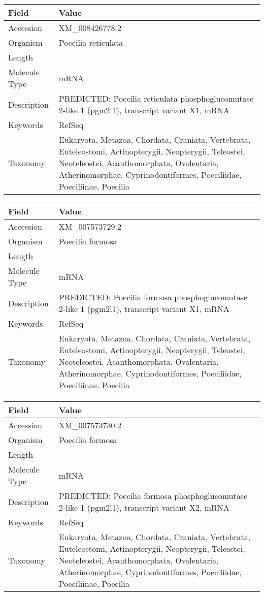 \documentclass[10pt]{article}
\begin{document}
{\footnotesize
\begin{longtable}{>{\raggedright\arraybackslash}p{4.5cm} >{\raggedright\arraybackslash}p{11.5cm}}
\textbf{Field} & \textbf{Value} \\
\hline
Accession & XM\_008426778.2 \\
Organism & Poecilia reticulata \\
Length & 3028 \\
Molecule Type & mRNA \\
Description & PREDICTED: Poecilia reticulata phosphoglucomutase 2-like 1 (pgm2l1), transcript variant X1, mRNA \\
Keywords & RefSeq \\
Taxonomy & Eukaryota, Metazoa, Chordata, Craniata, Vertebrata, Euteleostomi, Actinopterygii, Neopterygii, Teleostei, Neoteleostei, Acanthomorphata, Ovalentaria, Atherinomorphae, Cyprinodontiformes, Poeciliidae, Poeciliinae, Poecilia \\
\end{longtable}
}

{\footnotesize
\begin{longtable}{>{\raggedright\arraybackslash}p{4.5cm} >{\raggedright\arraybackslash}p{11.5cm}}
\textbf{Field} & \textbf{Value} \\
\hline
Accession & XM\_007573729.2 \\
Organism & Poecilia formosa \\
Length & 2598 \\
Molecule Type & mRNA \\
Description & PREDICTED: Poecilia formosa phosphoglucomutase 2-like 1 (pgm2l1), transcript variant X1, mRNA \\
Keywords & RefSeq \\
Taxonomy & Eukaryota, Metazoa, Chordata, Craniata, Vertebrata, Euteleostomi, Actinopterygii, Neopterygii, Teleostei, Neoteleostei, Acanthomorphata, Ovalentaria, Atherinomorphae, Cyprinodontiformes, Poeciliidae, Poeciliinae, Poecilia \\
\end{longtable}
}

{\footnotesize
\begin{longtable}{>{\raggedright\arraybackslash}p{4.5cm} >{\raggedright\arraybackslash}p{11.5cm}}
\textbf{Field} & \textbf{Value} \\
\hline
Accession & XM\_007573730.2 \\
Organism & Poecilia formosa \\
Length & 2592 \\
Molecule Type & mRNA \\
Description & PREDICTED: Poecilia formosa phosphoglucomutase 2-like 1 (pgm2l1), transcript variant X2, mRNA \\
Keywords & RefSeq \\
Taxonomy & Eukaryota, Metazoa, Chordata, Craniata, Vertebrata, Euteleostomi, Actinopterygii, Neopterygii, Teleostei, Neoteleostei, Acanthomorphata, Ovalentaria, Atherinomorphae, Cyprinodontiformes, Poeciliidae, Poeciliinae, Poecilia \\
\end{longtable}
}
\end{document}
